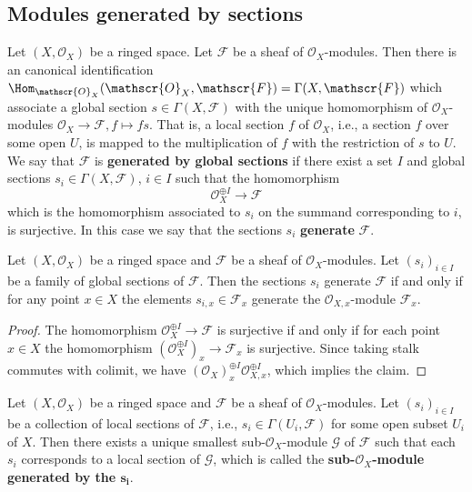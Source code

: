 \subsection{Modules generated by sections}
Let $(X,\mathscr{O}_X)$ be a ringed space. Let $\mathscr{F}$ be a sheaf of $\mathscr{O}_X$-modules. Then there is an canonical identification $\Hom_{\mathscr{O}_X}(\mathscr{O}_{X},\mathscr{F})=\Gamma(X,\mathscr{F})$ which associate a global section $s\in\Gamma(X,\mathscr{F})$ with the unique homomorphism of $\mathscr{O}_X$-modules $\mathscr{O}_X\to\mathscr{F},f\mapsto fs$. That is, a local section $f$ of $\mathscr{O}_X$, i.e., a section $f$ over some open $U$, is mapped to the multiplication of $f$ with the restriction of $s$ to $U$. We say that $\mathscr{F}$ is \textbf{generated by global sections} if there exist a set $I$ and global sections $s_i\in\Gamma(X,\mathscr{F})$, $i\in I$ such that the homomorphism
\[\mathscr{O}_X^{\oplus I}\to\mathscr{F}\]
which is the homomorphism associated to $s_i$ on the summand corresponding to $i$, is surjective. In this case we say that the sections $s_i$ \textbf{generate} $\mathscr{F}$.
\begin{proposition}\label{sheaf of module global section generate iff}
Let $(X,\mathscr{O}_X)$ be a ringed space and $\mathscr{F}$ be a sheaf of $\mathscr{O}_X$-modules. Let $(s_i)_{i\in I}$ be a family of global sections of $\mathscr{F}$. Then the sections $s_i$ generate $\mathscr{F}$ if and only if for any point $x\in X$ the elements $s_{i,x}\in\mathscr{F}_x$ generate the $\mathscr{O}_{X,x}$-module $\mathscr{F}_x$.
\end{proposition}
\begin{proof}
The homomorphism $\mathscr{O}_X^{\oplus I}\to\mathscr{F}$ is surjective if and only if for each point $x\in X$ the homomorphism $(\mathscr{O}_{X}^{\oplus I})_x\to\mathscr{F}_x$ is surjective. Since taking stalk commutes with colimit, we have $(\mathscr{O}_X)^{\oplus I}_x\mathscr{O}_{X,x}^{\oplus I}$, which implies the claim.
\end{proof}
\begin{proposition}\label{sheaf of module local section generate subsheaf}
Let $(X,\mathscr{O}_X)$ be a ringed space and $\mathscr{F}$ be a sheaf of $\mathscr{O}_X$-modules. Let $(s_i)_{i\in I}$ be a collection of local sections of $\mathscr{F}$, i.e., $s_i\in\Gamma(U_i,\mathscr{F})$ for some open subset $U_i$ of $X$. Then there exists a unique smallest sub-$\mathscr{O}_X$-module $\mathscr{G}$ of $\mathscr{F}$ such that each $s_i$ corresponds to a local section of $\mathscr{G}$, which is called the \textbf{sub-$\mathscr{O}_X$-module generated by the $\bm{s_i}$}.
\end{proposition}
